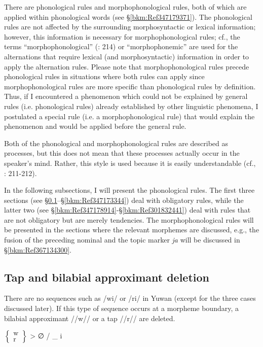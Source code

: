 There are phonological rules and morphophonological rules, both of which are applied within phonological words (see §\ref{bkm:Ref347179371}). The phonological rules are not affected by the surrounding morphosyntactic or lexical information; however, this information is necessary for morphophonological rules; cf., the terms “morphophonological” (\citealt{HaspelmathSims2010}: 214) or “morphophonemic” \citep[23-24]{Payne1997} are used for the alternations that require lexical (and morphosyntactic) information in order to apply the alternation rules. Please note that morphophonological rules precede phonological rules in situations where both rules can apply since morphophonological rules are more specific than phonological rules by definition. Thus, if I encountered a phenomenon which could not be explained by general rules (i.e. phonological rules) already established by other linguistic phenomena, I postulated a special rule (i.e. a morphophonological rule) that would explain the phenomenon and would be applied before the general rule.

  Both of the phonological and morphophonological rules are described as processes, but this does not mean that these processes actually occur in the speaker’s mind. Rather, this style is used because it is easily understandable (cf., \citealt{HaspelmathSims2010}: 211-212).

  In the following subsections, I will present the phonological rules. The first three sections (see §\ref{bkm:Ref304225942}--§\ref{bkm:Ref347173344}) deal with obligatory rules, while the latter two (see §\ref{bkm:Ref347178914}{}-§\ref{bkm:Ref301832441}) deal with rules that are not obligatory but are merely tendencies. The morphophonological rules will be presented in the sections where the relevant morphemes are discussed, e.g., the fusion of the preceding nominal and the topic marker \textit{ja} will be discussed in §\ref{bkm:Ref367134300}.

\subsection{Tap and bilabial approximant deletion}
\label{bkm:Ref304225942}\hypertarget{RefHeadingToc395696978}{}\label{bkm:Ref381399452}
There are no sequences such as /wi/ or /ri/ in Yuwan (except for the three cases discussed later). If this type of sequence occurs at a morpheme boundary, a bilabial approximant //w// or a tap //r// are deleted.

\ea $\left\{\begin{array}{c} \text{w}\\\text{r}\end{array}\right\}$ > ∅ / \_ i 

